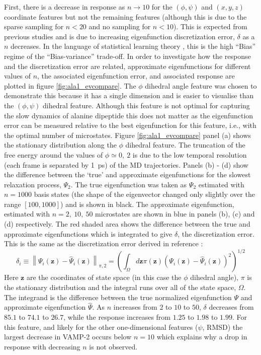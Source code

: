 First, there is a decrease in response as $n \rightarrow 10$ for the $(\phi, \psi)$ and $(x,y,z)$ coordinate features but not the remaining features (although this is due to the sparse sampling for $n<20$ and no sampling for $n<10$). This is expected from previous studies \cite{wuVariationalApproachLearning2020c,mcgibbonVariationalCrossvalidationSlow2015} and is due to increasing eigenfunction discretization error, $\delta$ \cite{prinzMarkovModelsMolecular2011} as a $n$ decreases. In the language of statistical learning theory \cite{friedman2001elements}, this is the high ``Bias'' regime of the ``Bias-variance'' trade-off.  In order to investigate how the response and the discretization error  are related,  approximate eigenfunctions for different values of $n$, the associated eigenfunction error, and associated response are plotted in figure \ref{fig:ala1_evcompare}. The $\phi$ dihedral angle feature was chosen to demonstrate this because it has a single dimension and is easier to visualise than the $(\phi, \psi)$ dihedral feature. Although this feature is not optimal for capturing the slow dynamics of alanine dipeptide this does not matter as the eigenfunction error can be measured relative to the best eigenfunction for this feature, i.e., with the optimal number of microstates.  Figure \ref{fig:ala1_evcompare} panel (a) shows the stationary distribution along the $\phi$ dihedral feature.  The truncation of the free energy around the values of $\phi \simeq 0,\ 2$ is due to the low temporal resolution (each frame is separated by \SI{1}{\pico\second}) of the MD trajectories.  Panels (b) - (d) show the difference between the `true' and approximate eigenfunctions for the slowest relaxation process, $\Psi_{2}$. The true eigenfunction was taken as $\Psi_{2}$ estimated with $n=1000$ basis states (the shape of the eigenvector changed only slightly over the range $[100, 1000]$) and is shown in black. The approximate eigenfunction, estimated with $n=2,\ 10,\ 50$ microstates are shown in blue in panels (b), (c) and (d) respectively. The red shaded area shows the difference between the true and approximate eigenfunctions which is integrated to give $\delta$, the discretization error. This is the same as the discretization error derived in reference \cite{prinzMarkovModelsMolecular2011}:
\begin{equation}
    \delta_{i} \equiv\left\|\Psi_{i}\left(\mathbf{z}\right)-\hat{\Psi}_{i}\left(\mathbf{z}\right)\right\|_{\pi, 2}=\left(\int_{\Omega} d \mathbf{z} \pi(\mathbf{z})(\Psi_{i}(\mathbf{z})-\hat{\Psi}_{i}(\mathbf{z}))^{2}\right)^{1 / 2}
\end{equation}
Here $\mathbf{z}$ are the coordinates of state space (in this case the $\phi$ dihedral angle), $\pi$ is the stationary distribution and the integral runs over all of the state space, $\Omega$. The integrand is the difference between the true normalized eigenfunction $\Psi$ and approximate eigenfunction $\hat{\Psi}$. As $n$ increases from $2$ to $10$ to $50$, $\delta$ decreases from $85.1$ to $74.1$ to $26.7$, while the response increases from $1.25$ to $1.98$ to $1.99$. For this feature, and likely for the other one-dimensional features ($\psi$, RMSD) the largest decrease in VAMP-2 occurs below $n=10$ which explains why a drop in response with decreasing $n$ is not observed. 

